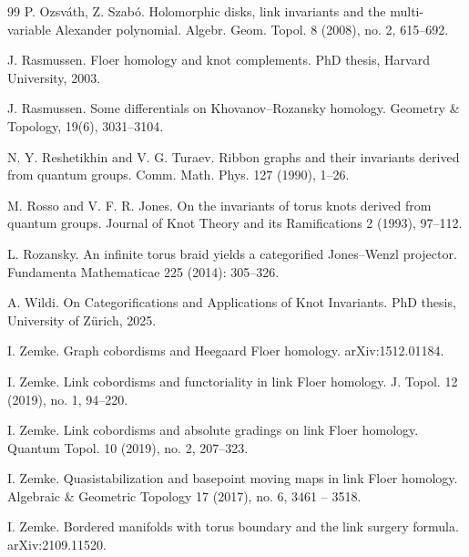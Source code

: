 \begin{thebibliography}{99}
 P. Ozsv\'ath, Z. Szab\'o. Holomorphic disks, link invariants and the multi-variable  Alexander polynomial. Algebr. Geom. Topol. 8 (2008), no. 2, 615--692.

 J. Rasmussen. Floer homology and knot complements. PhD thesis, Harvard University, 2003.



 J. Rasmussen. Some differentials on Khovanov–Rozansky homology. Geometry \& Topology, 19(6), 3031--3104.

  N. Y. Reshetikhin and V. G. Turaev. Ribbon graphs and their invariants derived from
quantum groups. Comm. Math. Phys. 127 (1990), 1--26.

 M. Rosso and V. F. R. Jones. On the invariants of torus knots derived from quantum groups. Journal of Knot Theory and its 
Ramifications 2 (1993), 97--112.

 L. Rozansky. An infinite torus braid yields a categorified Jones--Wenzl projector. Fundamenta Mathematicae 225 (2014): 305--326.

 A. Wildi. On Categorifications and Applications of Knot Invariants. PhD thesis, University of Z\"urich, 2025.


 I. Zemke. Graph cobordisms and Heegaard Floer homology. arXiv:1512.01184.

 I. Zemke. Link cobordisms and functoriality in link Floer homology. J. Topol. 12 (2019), no. 1, 94--220. 

 I. Zemke. Link cobordisms and absolute gradings on link Floer homology. Quantum Topol. 10 (2019), no. 2, 207--323. 

 I. Zemke. Quasistabilization and basepoint moving maps in link Floer homology. Algebraic \& Geometric Topology 17 (2017), no. 6, 3461 -- 3518.

 I. Zemke. Bordered manifolds with torus boundary and the link surgery formula. arXiv:2109.11520.


\end{thebibliography}
